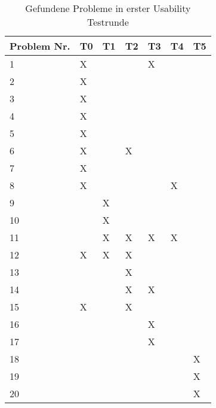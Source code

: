 \begin{table}[H]
    \caption{Gefundene Probleme in erster Usability Testrunde}\label{tbl:1stUsabilityTestsProblems}
    \begin{tabular}{l|l|l|l|l|l|l}
    Problem Nr. & T0    & T1    & T2    & T3    & T4    & T5    \\ \hline
    1           & X     &       &       & X     &       &       \\
    2           & X     &       &       &       &       &       \\
    3           & X     &       &       &       &       &       \\
    4           & X     &       &       &       &       &       \\
    5           & X     &       &       &       &       &       \\
    6           & X     &       & X     &       &       &       \\
    7           & X     &       &       &       &       &       \\
    8           & X     &       &       &       & X     &       \\
    9           &       & X     &       &       &       &       \\
    10          &       & X     &       &       &       &       \\
    11          &       & X     & X     & X     & X     &       \\
    12          & X     & X     & X     &       &       &       \\
    13          &       &       & X     &       &       &       \\
    14          &       &       & X     & X     &       &       \\
    15          & X     &       & X     &       &       &       \\
    16          &       &       &       & X     &       &       \\
    17          &       &       &       & X     &       &       \\
    18          &       &       &       &       &       & X     \\
    19          &       &       &       &       &       & X     \\
    20          &       &       &       &       &       & X     \\
    \end{tabular}    
\end{table}

